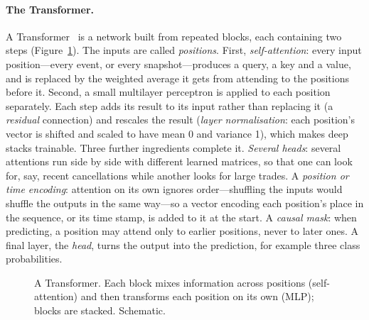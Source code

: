 \paragraph{The Transformer.} A Transformer~\citep{vaswani2017} is a network built from repeated blocks, each
containing two steps (Figure~\ref{fig:transformer-block}). The inputs are called \emph{positions}. First, \emph{self-attention}:
every input position---every event, or every snapshot---produces a query, a key and a value, and is replaced by the
weighted average it gets from attending to the positions before it. Second, a small multilayer perceptron is applied
to each position separately.
Each step adds its result to its input rather than replacing it (a \emph{residual} connection) and rescales the
result (\emph{layer normalisation}: each position's vector is shifted and scaled to have mean 0 and variance 1),
which makes deep stacks trainable. Three further ingredients complete it. \emph{Several
heads}: several attentions run side by side with different learned matrices, so that one can look for, say, recent
cancellations while another looks for large trades. A \emph{position or time encoding}: attention on its own ignores
order---shuffling the inputs would shuffle the outputs in the same way---so a vector encoding each position's
place in the sequence, or its time stamp, is added to it at the start. A \emph{causal mask}: when predicting, a
position may attend only to earlier positions, never to later ones. A final layer, the \emph{head}, turns the output into the
prediction, for example three class probabilities.

\begin{figure}[!htbp]
\centering
{}
\caption{A Transformer. Each block mixes information across positions (self-attention) and then transforms each
position on its own (MLP); blocks are stacked. Schematic.}
\label{fig:transformer-block}
\end{figure}

